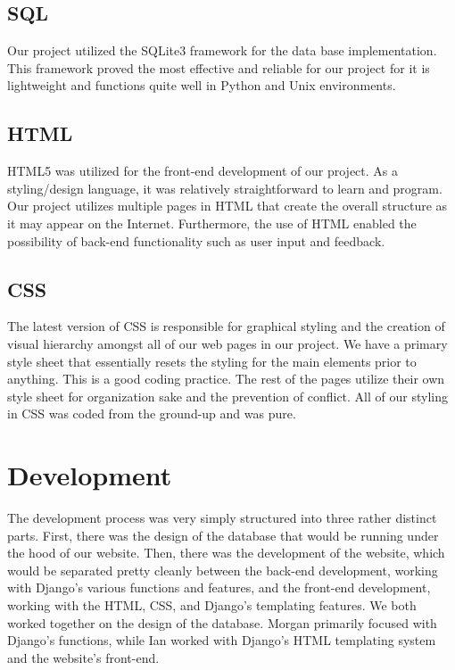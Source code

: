 \documentclass[sigconf]{acmart}
\begin{document}
\subsection{SQL}
Our project utilized the SQLite3 framework for the data base implementation. This framework proved the most effective and reliable for our project for it is lightweight and functions quite well in Python and Unix environments.

\subsection{HTML}
HTML5 was utilized for the front-end development of our project. As a styling/design language, it was relatively straightforward to learn and program. Our project utilizes multiple pages in HTML that create the overall structure as it may appear on the Internet. Furthermore, the use of HTML enabled the possibility of back-end functionality such as user input and feedback.

\subsection{CSS}
The latest version of CSS is responsible for graphical styling and the creation of visual hierarchy amongst all of our web pages in our project. We have a primary style sheet that essentially resets the styling for the main elements prior to anything. This is a good coding practice. The rest of the pages utilize their own style sheet for organization sake and the prevention of conflict. All of our styling in CSS was coded from the ground-up and was pure.


\section{Development}\label{development}
The development process was very simply structured into three rather distinct parts. First, there was the design of the database that would be running under the hood of our website. Then, there was the development of the website, which would be separated pretty cleanly between the back-end development, working with Django's various functions and features, and the front-end development, working with the HTML, CSS, and Django's templating features. We both worked together on the design of the database. Morgan primarily focused with Django's functions, while Ian worked with Django's HTML templating system and the website's front-end.
\end{document}
